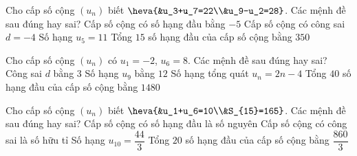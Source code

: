 \begin{ex}%
 Cho cấp số cộng $(u_n)$ biết $\heva{&u_3+u_7=22\\&u_9-u_2=28}$. Các mệnh đề sau đúng hay  sai?
 \choiceTF 
  {\True Cấp số cộng có số hạng đầu bằng $-5$} 
  {Cấp số cộng có  công sai $d=-4$}
  {\True Số hạng $u_5=11$} 
  {Tổng $15$ số hạng  đầu của cấp số cộng bằng $350$}
\end{ex}

\begin{ex}%
 Cho cấp số cộng $(u_n)$ có $u_1=-2$, $u_6=8$. Các mệnh đề sau  đúng hay sai?
  \choiceTF
  {Công sai $d$ bằng  $3$}
  {Số hạng $u_9$ bằng  $12$}
  {\True Số hạng tổng quát $u_n=2n-4$} 
  {\True Tổng $40$ số hạng đầu  của cấp số cộng bằng $1480$}
\end{ex}

\begin{ex}%
 Cho cấp số cộng $(u_n)$ biết $\heva{&u_1+u_6=10\\&S_{15}=165}$. Các mệnh  đề sau đúng hay sai?
  \choiceTF
  {Cấp số cộng có số hạng  đầu là số nguyên}
  {\True Cấp số cộng  có công sai là số hữu tỉ}
  {\True Số hạng  $u_{10}=\dfrac{44}{3}$}
  {\True Tổng $20$ số hạng đầu của  cấp số cộng bằng $\dfrac{860}{3}$}
\end{ex}

